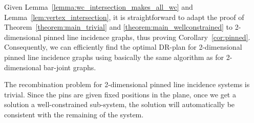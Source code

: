 Given Lemma~\ref{lemma:wc_intersection_makes_all_wc} and Lemma~\ref{lem:vertex_intersection},
it is straightforward to adapt the proof of Theorem~\ref{theorem:main_trivial} and \ref{theorem:main_wellconstrained}
to  2-dimensional pinned line incidence graphs,
thus proving Corollary~\ref{cor:pinned}.
Consequently, we can efficiently find the optimal DR-plan for 2-dimensional pinned line incidence graphs using basically the same algorithm as for 2-dimensional bar-joint graphs.

The recombination problem for 2-dimensional pinned line incidence systems is trivial.
Since the pins are given fixed positions in the plane,
once we get a solution a well-constrained sub-system,
the solution will automatically be consistent with the remaining of the system.

